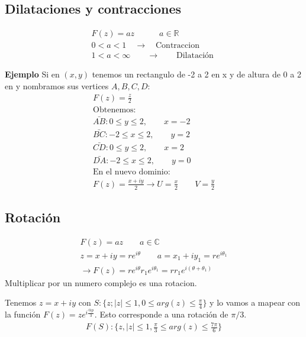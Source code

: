 \documentclass{article}
\newcommand{\caja}[3]{%
  \begin{tcolorbox}[colback=#1!5!white,colframe=#1!25!black,title=#2]
    #3
  \end{tcolorbox}%
}
\begin{document}
\subsection{Dilataciones y contracciones }
\caja{green}{Definicio de dilatacion y contraccion }{
  \begin{gather}
    F(z) = a z \qquad \quad a\in \mathbb{R}\\
    0<a<1 \quad \rightarrow \quad \text{Contraccion }\\
    1<a<\infty \qquad \rightarrow \qquad \text{Dilatación }
    \label{eq:rotaciones }
  \end{gather}
}
\textbf{Ejemplo } Si en $ (x,y)  $ tenemos un rectangulo de -2 a 2 en x y de altura de 0 a 2 en y nombramos sus vertices $ A,B,C,D  $:
\begin{gather}
  F\left(z\right)=\frac{z}{2}\\
  \text{Obtenemos:}\\
  \bar{AB}: 0\leq y \leq 2, \qquad x = -2 \\
  \bar{BC}: -2\leq x\leq2, \qquad y = 2\\
  \bar{CD }: 0\leq y\leq 2, \qquad x = 2\\
  \bar{DA}: -2 \leq x\leq 2, \qquad y = 0\\
  \text{En el nuevo dominio: }\\
  F\left(z\right)=\frac{x+iy }{2}\rightarrow U = \frac{x}{2}\qquad V = \frac{y}{2}
  \label{eq:ej_rectangulo_dilatacion_contraccion}
\end{gather}

\subsection{Rotación }
\caja{green}{Definicion rotación }{
  \begin{gather}
    F\left(z\right)= a z \qquad a \in \mathbb{C}\\
    z = x+ iy = re ^ {i\theta } \qquad a = x_1+iy_1 = re ^ {i \theta_1}\\
    \rightarrow F\left(z\right)=re ^ {i \theta } r_1 e ^ {i \theta_1 } = r r_1 e ^ {i(\theta+\theta_1)}
    \label{eq:def_rotacion}
  \end{gather}
  Multiplicar por un numero complejo es una rotacion.
}
\caja{blue}{Ejercicio}{
  Tenemos $ z = x+iy  $ con $ S: \{ z; \left|z \right|\leq 1, 0 \leq arg(z)\leq \frac{\pi}{4} \} $ y lo vamos a mapear con la función $ F(z) = z e ^ {i \frac{@p }{3 }} $. Esto corresponde a una rotación de $ \pi/3  $.
  \begin{gather}
    F(S): \{ z, \left|z \right|\leq 1 , \frac{\pi}{3}\leq arg(z)\leq \frac{7\pi}{6}  \}
  \end{gather}
}
\end{document}

